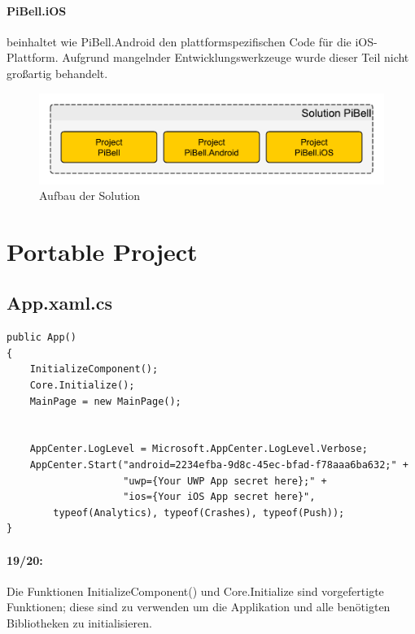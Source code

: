 \paragraph{PiBell.iOS} beinhaltet wie PiBell.Android den plattformspezifischen Code für die iOS-Platt\-form. Aufgrund mangelnder Entwicklungswerkzeuge wurde dieser Teil nicht großartig behandelt.\par

\begin{figure}[H]
\centering\includegraphics[width=0.9\linewidth]{images/xamarin/struktur.pdf}
\caption{Aufbau der Solution}
\end{figure}

%
\section{Portable Project}
\subsection{App.xaml.cs}
\begin{lstlisting}[firstnumber=17]
public App()
{
    InitializeComponent();
    Core.Initialize();
    MainPage = new MainPage();


    AppCenter.LogLevel = Microsoft.AppCenter.LogLevel.Verbose;
    AppCenter.Start("android=2234efba-9d8c-45ec-bfad-f78aaa6ba632;" +
                    "uwp={Your UWP App secret here};" +
                    "ios={Your iOS App secret here}",
        typeof(Analytics), typeof(Crashes), typeof(Push));
}
\end{lstlisting}
\paragraph{19/20:} Die Funktionen InitializeComponent() und Core.Initialize sind vorgefertigte Funktionen; diese sind zu verwenden um die Applikation und alle benötigten Bibliotheken zu initialisieren.
